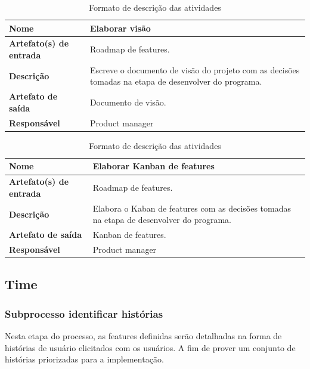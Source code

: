 \begin{table}[h]
    \centering
    \label{descricaoAtividades}
    \caption{Formato de descrição das atividades}
        \begin{tabular}{|l|p{10cm}|}
        \hline
        \textbf{Nome} & Elaborar visão \\
        \hline
        \textbf{Artefato(s) de entrada} & Roadmap de features. \\
        \hline
        \textbf{Descrição} & Escreve o documento de visão do projeto com as decisões tomadas na etapa de desenvolver do programa. \\
        \hline
        \textbf{Artefato de saída} & Documento de visão. \\
        \hline
        \textbf{Responsável} & Product manager \\
        \hline
    \end{tabular}
\end{table}

\begin{table}[h]
    \centering
    \label{descricaoAtividades}
    \caption{Formato de descrição das atividades}
        \begin{tabular}{|l|p{10cm}|}
        \hline
        \textbf{Nome} & Elaborar Kanban de features \\
        \hline
        \textbf{Artefato(s) de entrada} & Roadmap de features. \\
        \hline
        \textbf{Descrição} & Elabora o Kaban de features com as decisões tomadas na etapa de desenvolver do programa. \\
        \hline
        \textbf{Artefato de saída} & Kanban de features. \\
        \hline
        \textbf{Responsável} & Product manager \\
        \hline
    \end{tabular}
\end{table}

\subsection{Time}
\subsubsection{ Subprocesso identificar histórias}

Nesta etapa do processo, as features definidas serão detalhadas na forma de histórias de usuário elicitados com os usuários. A fim de prover um conjunto de histórias priorizadas para a implementação.

